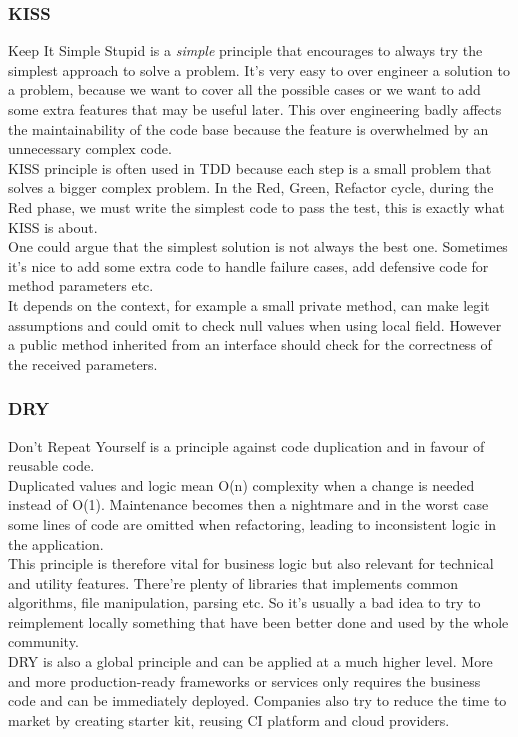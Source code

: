 \subsubsection{KISS}
Keep It Simple Stupid is a \textit{simple} principle that encourages to
always try the simplest approach to solve a problem.
It's very easy to over engineer a solution to a problem, because we want
to cover all the possible cases or we want to add some extra
features that may be useful later.
This over engineering badly affects the maintainability of the code base
because the feature is overwhelmed by an unnecessary complex code. \\
\newline
KISS principle is often used in TDD because each step is a small
problem that solves a bigger complex problem.
In the Red, Green, Refactor cycle, during the Red phase, we must write
the simplest code to pass the test, this is exactly what KISS is about.
\\
\newline
One could argue that the simplest solution is not always the best one.
Sometimes it's nice to add some extra code to handle failure cases, add
defensive code for method parameters etc. \\
It depends on the context, for example a small private method, can make
legit assumptions and could omit to check null values when using
local field.
However a public method inherited from an interface should check for the
correctness of the received parameters.

\subsubsection{DRY}
Don't Repeat Yourself is a principle against code duplication and in
favour of reusable code. \\
Duplicated values and logic mean O(n) complexity when a change is needed
instead of O(1).
Maintenance becomes then a nightmare and in the worst case some lines of
code are omitted when refactoring, leading to inconsistent logic in the
application. \\
\newline
This principle is therefore vital for business logic but also relevant
for technical and utility features.
There're plenty of libraries that implements common algorithms, file
manipulation, parsing etc.
So it's usually a bad idea to try to reimplement locally something that
have been better done and used by the whole community. \\
\newline
DRY is also a global principle and can be applied at a much higher level.
More and more production-ready frameworks or services only requires
the business code and can be immediately deployed.
Companies also try to reduce the time to market by creating starter kit,
reusing CI platform and cloud providers.

